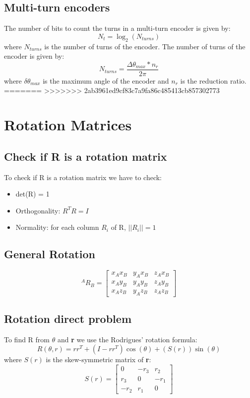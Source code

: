 \documentclass[11pt]{article}
\begin{document}
\subsection{Multi-turn encoders}
The number of bits to count the turns in a multi-turn encoder is given by:
\begin{equation}
    N_t = \log_2(N_{turns})
\end{equation}
where $N_{turns}$ is the number of turns of the encoder.
The number of turns of the encoder is given by:
\begin{equation}
    N_{turns} = \frac{\Delta\theta_{max}*n_r}{2\pi}
\end{equation}
where $\delta\theta_{max}$ is the maximum angle of the encoder and $n_r$ is the reduction ratio.
=======
\clearpage
>>>>>>> 2ab3961ed9cf83c7a9fa86c485413cb857302773
\section{Rotation Matrices}\label{sec:rotation}
\subsection{Check if R is a rotation matrix}\label{sec:check_rotation}
To check if R is a rotation matrix we have to check:
\begin{itemize}
\item det(R) = 1
\item Orthogonality: $R^TR = I$
\item Normality: for each column $R_i$ of R, $||R_i|| = 1$
\end{itemize}
\subsection{General Rotation}
\begin{equation}
^{A}R_B = \begin{bmatrix}
x_A  x_B & y_A x_B & z_A x_B \\
x_A  y_B & y_A y_B & z_A y_B \\
x_A  z_B & y_A z_B & z_A z_B
\end{bmatrix}
\end{equation}

\subsection{Rotation direct problem}
To find R from $\theta$ and \textbf{r} we use the Rodrigues' rotation formula:
\begin{equation}
R(\theta, r)= rr^T+ (I-rr^T)\cos(\theta) + (S(r))\sin(\theta)
\end{equation}
where $S(r)$ is the skew-symmetric matrix of \textbf{r}:
\begin{equation}
S(r) = \begin{bmatrix}
0 & -r_3 & r_2 \\
r_3 & 0 & -r_1 \\
-r_2 & r_1 & 0
\end{bmatrix}
\end{equation}
\end{document}
